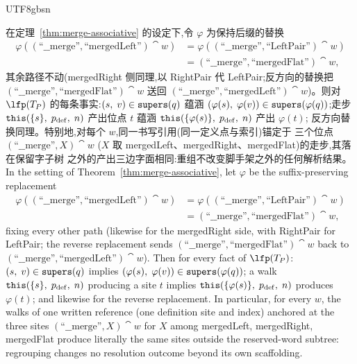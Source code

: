\begin{CJK*}{UTF8}{gbsn}
\begin{corollary}
  \label{cor:merge-this-preservation}
  \ifPaperChinese
  在定理~\ref{thm:merge-associative} 的设定下,令 $\varphi$ 为保持后缀的替换
  \[
    \begin{aligned}
      \varphi((\text{``\_\_merge''}, \text{``mergedLeft''}) \cat w)
      &= \varphi((\text{``\_\_merge''}, \text{``LeftPair''}) \cat w) \\
      &= (\text{``\_\_merge''}, \text{``mergedFlat''}) \cat w,
    \end{aligned}
  \]
  \sloppy
  其余路径不动(mergedRight 侧同理,以 RightPair 代 LeftPair;反方向的替换把
  $(\text{``\_\_merge''}, \text{``mergedFlat''}) \cat w$ 送回
  $(\text{``\_\_merge''}, \text{``mergedLeft''}) \cat w$)。则对 $\lfp(T_P)$
  的每条事实:$(s,\; v) \in \mathtt{supers}(q)$ 蕴涵
  $(\varphi(s),\; \varphi(v)) \in \mathtt{supers}(\varphi(q))$;走步
  $\mathtt{this}(\{s\},\; p_{\mathrm{def}},\; n)$ 产出位点 $t$ 蕴涵
  $\mathtt{this}(\{\varphi(s)\},\; p_{\mathrm{def}},\; n)$ 产出 $\varphi(t)$;
  反方向替换同理。特别地,对每个 $w$,同一书写引用(同一定义点与索引)锚定于
  三个位点 $(\text{``\_\_merge''}, X) \cat w$
  ($X$ 取 mergedLeft、mergedRight、mergedFlat)的走步,其落在保留字子树
  之外的产出三边字面相同:重组不改变脚手架之外的任何解析结果。
  \else
  In the setting of Theorem~\ref{thm:merge-associative}, let
  $\varphi$ be the suffix-preserving replacement
  \[
    \begin{aligned}
      \varphi((\text{``\_\_merge''}, \text{``mergedLeft''}) \cat w)
      &= \varphi((\text{``\_\_merge''}, \text{``LeftPair''}) \cat w) \\
      &= (\text{``\_\_merge''}, \text{``mergedFlat''}) \cat w,
    \end{aligned}
  \]
  fixing every other path (likewise for the mergedRight side, with
  RightPair for LeftPair; the reverse replacement sends
  $(\text{``\_\_merge''}, \text{``mergedFlat''}) \cat w$ back to
  $(\text{``\_\_merge''}, \text{``mergedLeft''}) \cat w$). Then for
  every fact of $\lfp(T_P)$: $(s,\; v) \in \mathtt{supers}(q)$ implies
  $(\varphi(s),\; \varphi(v)) \in \mathtt{supers}(\varphi(q))$; a walk
  $\mathtt{this}(\{s\},\; p_{\mathrm{def}},\; n)$ producing a site $t$
  implies $\mathtt{this}(\{\varphi(s)\},\; p_{\mathrm{def}},\; n)$ produces
  $\varphi(t)$; and likewise for the reverse replacement. In
  particular, for every $w$, the walks of one written reference (one
  definition site and index) anchored at the three sites
  $(\text{``\_\_merge''}, X) \cat w$ for $X$ among mergedLeft,
  mergedRight, mergedFlat produce literally the same sites outside
  the reserved-word subtree: regrouping changes no resolution
  outcome beyond its own scaffolding.
  \fi
\end{corollary}


\end{CJK*}
